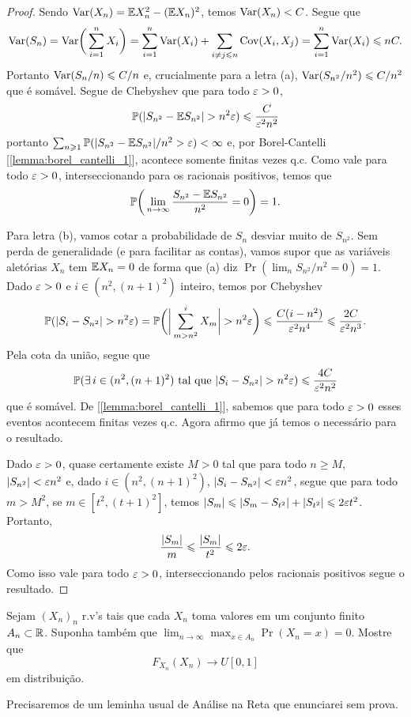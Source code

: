 \begin{proof}
	Sendo $\text{Var}(X_n) = \mathbb{E} X_n^2 - (\mathbb{E} X_n)^2$, temos $\text{Var}(X_n) < C$. Segue que
	\[
		\text{Var}(S_n) = \text{Var}\bigg(\sum_{i=1}^n X_i\bigg) = \sum_{i=1}^n
		\text{Var}(X_i) + \sum_{i \neq j \leqslant n} \text{Cov}(X_i,X_j) =
		\sum_{i=1}^n \text{Var}(X_i) \leqslant nC.
	\]
	Portanto $\text{Var}(S_n/n) \leqslant C/n$ e, crucialmente para a letra (a),
	$\text{Var}(S_{n^2}/n^2) \leqslant C/n^2$ que é somável.
	Segue de Chebyshev que para todo $\varepsilon > 0$,
	\[
		\mathbb{P}(|S_{n^2} - \mathbb{E} S_{n^2}| > n^2\varepsilon) \leqslant \frac{C}{\varepsilon^2n^2}
	\]
	portanto $\sum_{n\geqslant 1} \mathbb{P}(|S_{n^2} - \mathbb{E} S_{n^2}|/n^2 >\varepsilon) <
	\infty$ e, por Borel-Cantelli [\ref{lemma:borel_cantelli_1}],
	acontece somente finitas vezes q.c.
	Como vale para todo $\varepsilon > 0$, interseccionando para os racionais
	positivos, temos que
	\[
		\mathbb{P}\bigg(\lim_{n\rightarrow \infty} \frac{S_{n^2} - \mathbb{E} S_{n^2}}{n^2} = 0\bigg) = 1.
	\]

	Para letra (b), vamos cotar a probabilidade de $S_n$ desviar muito
	de $S_{n^2}$. Sem perda de generalidade (e para facilitar as contas), vamos
	supor que as variáveis aletórias $X_n$ tem $\mathbb{E} X_n = 0$ de forma
	que (a) diz $\Pr(\lim_n S_{n^2}/n^2 = 0) = 1$. Dado $\varepsilon > 0$ e $i
	\in (n^2, (n+1)^2)$ inteiro, temos por Chebyshev
	\[
		\Pr(|S_i - S_{n^2}|> n^2\eps) = \Pr\bigg(\bigg|\sum_{m > n^2}^i
		X_m\bigg| > n^2\eps\bigg) \leq \frac{C(i-n^2)}{\eps^2n^4} \leq
		\frac{2C}{\eps^2n^3}.
	\]
	Pela cota da união, segue que
	\[
		\Pr(\exists\,i \in (n^2, (n+1)^2) \text{ tal que } |S_i - S_{n^2}|>
		n^2\eps) \leq \frac{4C}{\eps^2n^2}
	\]
	que é somável. De [\ref{lemma:borel_cantelli_1}], sabemos que para
	todo $\varepsilon > 0$ esses eventos acontecem finitas vezes q.c.
	Agora afirmo que já temos o necessário para o resultado.

	Dado $\varepsilon > 0$, quase certamente existe $M > 0$ tal que para todo
	$n \geq M$, $|S_{n^2}| < \varepsilon n^2$ e,
	dado $i \in (n^2, (n+1)^2)$, $|S_i - S_{n^2}| < \varepsilon n^2$, segue que
	para todo $m > M^2$, se $m \in [t^2, (t+1)^2]$, temos
	$|S_m| \leqslant |S_m - S_{t^2}| + |S_{t^2}| \leqslant 2\varepsilon t^2$. Portanto,
	\[
		\frac{|S_m|}{m} \leqslant \frac{|S_m|}{t^2} \leqslant 2\varepsilon.
	\]
	Como isso vale para todo $\varepsilon > 0$, interseccionando pelos
	racionais positivos segue o resultado.
\end{proof}

\begin{exercise}
	Sejam $(X_n)_n$ r.v's tais que cada $X_n$ toma valores em um
	conjunto finito $A_n \subset \mathbb{R}$. Suponha também
	que $\lim_{n\to\infty} \max_{x \in A_n} \Pr(X_n = x) = 0$. Mostre que
	\[
		F_{X_n}(X_n) \to U[0,1]
	\]
	em distribuição.
\end{exercise}
Precisaremos de um leminha usual de Análise na Reta que enunciarei sem prova.

